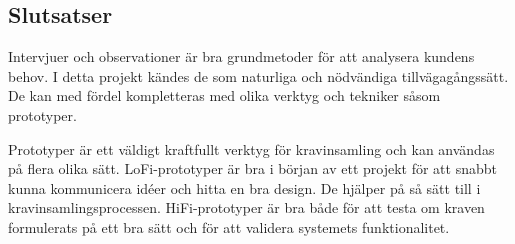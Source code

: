 \subsection{Slutsatser}
Intervjuer och observationer är bra grundmetoder för att analysera kundens behov. I detta projekt kändes de som naturliga och nödvändiga tillvägagångssätt. De kan med fördel kompletteras med olika verktyg och tekniker såsom prototyper. 

Prototyper är ett väldigt kraftfullt verktyg för kravinsamling och kan användas på flera olika sätt. LoFi-prototyper är bra i början av ett projekt för att snabbt kunna kommunicera idéer och hitta en bra design. De hjälper på så sätt till i kravinsamlingsprocessen. HiFi-prototyper är bra både för att testa om kraven formulerats på ett bra sätt och för att validera systemets funktionalitet.







